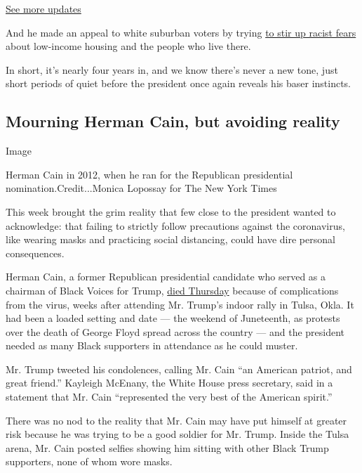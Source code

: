 \href{https://www.nytimes3xbfgragh.onion/2020/07/31/us/elections/biden-vs-trump.html?action=click\&pgtype=Article\&state=default\&region=MAIN_CONTENT_1\&context=storylines_live_updates}{See
more updates}

And he made an appeal to white suburban voters by trying
\href{https://www.nytimes3xbfgragh.onion/2020/07/29/us/politics/trump-suburbs-housing-white-voters.html}{to
stir up racist fears} about low-income housing and the people who live
there.

In short, it's nearly four years in, and we know there's never a new
tone, just short periods of quiet before the president once again
reveals his baser instincts.

\hypertarget{mourning-herman-cain-but-avoiding-reality}{%
\subsection{Mourning Herman Cain, but avoiding
reality}\label{mourning-herman-cain-but-avoiding-reality}}

Image

Herman Cain in 2012, when he ran for the Republican presidential
nomination.Credit...Monica Lopossay for The New York Times

This week brought the grim reality that few close to the president
wanted to acknowledge: that failing to strictly follow precautions
against the coronavirus, like wearing masks and practicing social
distancing, could have dire personal consequences.

Herman Cain, a former Republican presidential candidate who served as a
chairman of Black Voices for Trump,
\href{https://www.nytimes3xbfgragh.onion/2020/07/30/us/politics/herman-cain-dead.html}{died
Thursday} because of complications from the virus, weeks after attending
Mr. Trump's indoor rally in Tulsa, Okla. It had been a loaded setting
and date --- the weekend of Juneteenth, as protests over the death of
George Floyd spread across the country --- and the president needed as
many Black supporters in attendance as he could muster.

Mr. Trump tweeted his condolences, calling Mr. Cain ``an American
patriot, and great friend.'' Kayleigh McEnany, the White House press
secretary, said in a statement that Mr. Cain ``represented the very best
of the American spirit.''

There was no nod to the reality that Mr. Cain may have put himself at
greater risk because he was trying to be a good soldier for Mr. Trump.
Inside the Tulsa arena, Mr. Cain posted selfies showing him sitting with
other Black Trump supporters, none of whom wore masks.

